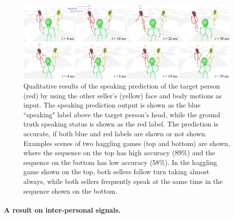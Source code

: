 \begin{figure}[t]
	\centering       
	\includegraphics[trim=20 10 2 10,clip, width=\linewidth]{ssp_fig/qual_predSpeak}
	\caption{Qualitative results of the speaking prediction of the target person (red) by using the other seller's (yellow) face and body motions as input. The speaking prediction output is shown as the blue ``speaking" label above the target person's head, while the ground truth speaking status is shown as the red label. The prediction is accurate, if both blue and red labels are shown or not shown. Examples scenes of two haggling games (top and bottom) are shown, where the sequence on the top has high accuracy (89\%) and the sequence on the bottom has low accuracy (58\%). In the haggling game shown on the top, both sellers follow turn taking almost always, while both sellers frequently speak at the same time in the sequence shown on the bottom.} 
	\label{fig:qual_spek_pred}
\end{figure}


\paragraph{A result on inter-personal signals.}


